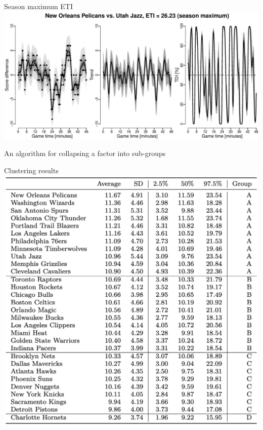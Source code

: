 \documentclass[ignorenonframetext,xcolor=pdflatex,table,dvipsnames,serif]{beamer}
\begin{document}
\begin{frame}{Season maximum ETI}
\includegraphics[scale=0.5]{fig4_5.pdf}
\end{frame}



\begin{frame}{An algorithm for collapsing a factor into sub-groups}
\end{frame}


\begin{frame}{Clustering results}
\center\includegraphics[scale=0.4]{tab1.png}
\end{frame}
\end{document}
